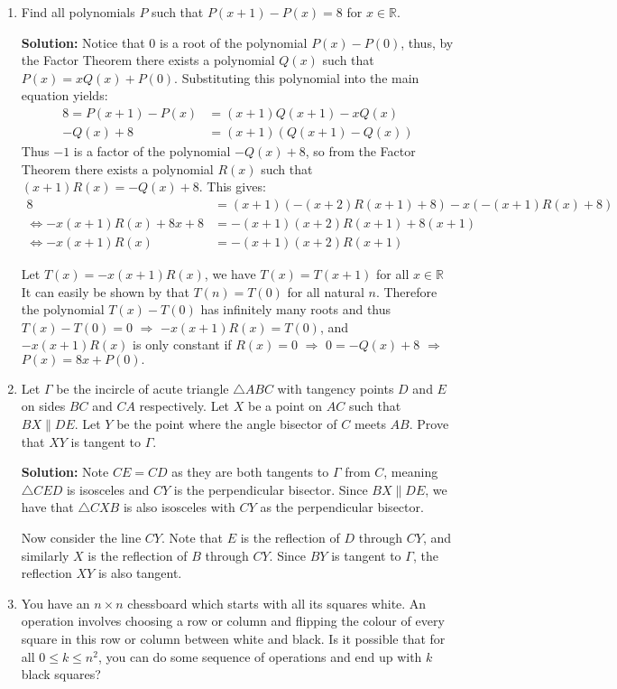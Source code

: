 \documentclass{article}
\begin{document}
\begin{enumerate}[itemsep=24pt]
\item
Find all polynomials $P$ such that $P(x+1) - P(x) = 8$ for $x\in\mathbb{R}$.

\textbf{Solution:} Notice that 0 is a root of the polynomial $P(x) - P(0)$, thus, by the Factor Theorem there exists a polynomial $Q(x)$ such that $P(x) = xQ(x) + P(0)$.
Substituting this polynomial into the main equation yields:
\begin{align*}
  8 = P(x+1) - P(x) & = (x+1)Q(x + 1) - xQ(x) \\
          -Q(x) + 8 & = (x+1)(Q(x+1) - Q(x))
\end{align*}
Thus $-1$ is a factor of the polynomial $-Q(x) + 8$, so from the Factor Theorem there exists a polynomial $R(x)$ such that $(x+1)R(x) = - Q(x) + 8$.
This gives:
\begin{align*}
  8 & = (x+1)(-(x+2)R(x+1) + 8) - x(-(x+1)R(x) + 8) \\
  \iff -x(x+1)R(x) + 8x + 8 & = -(x+1)(x+2)R(x+1) + 8(x+1) \\
  \iff -x(x+1)R(x) & = -(x+1)(x+2)R(x+1)
\end{align*}

Let $T(x) = -x(x+1)R(x)$, we have $T(x) = T(x+1)$ for all $x \in \mathbb{R}$ It can easily be shown by that $T(n) = T(0)$ for all natural $n$.
Therefore the polynomial $T(x) - T(0)$ has infinitely many roots and thus $T(x) - T(0) = 0$ $\Rightarrow$ $-x(x+1)R(x) = T(0)$, and $-x(x+1)R(x)$ is only constant if $R(x) = 0$ $\Rightarrow$ $0 = -Q(x) + 8$ $\Rightarrow$ $P(x) = 8x + P(0).$


\item %
Let $\Gamma$ be the incircle of acute triangle $\triangle ABC$ with tangency points $D$ and $E$ on sides $BC$ and $CA$ respectively.
Let $X$ be a point on $AC$ such that $BX \parallel DE$.
Let $Y$ be the point where the angle bisector of $C$ meets $AB$.
Prove that $XY$ is tangent to $\Gamma$.

\textbf{Solution:}
Note $CE = CD$ as they are both tangents to $\Gamma$ from $C$, meaning $\triangle CED$ is isosceles and $CY$ is the perpendicular bisector. Since $BX \parallel DE$, we have that $\triangle CXB$ is also isosceles with $CY$ as the perpendicular bisector.

Now consider the line $CY$. Note that $E$ is the reflection of $D$ through $CY$, and similarly $X$ is the reflection of $B$ through $CY$. Since $BY$ is tangent to $\Gamma$, the reflection $XY$ is also tangent.


\item %
You have an $n \times n$ chessboard which starts with all its squares white.
An operation involves choosing a row or column and flipping the colour of every square in this row or column between white and black.
Is it possible that for all $0 \leq k \leq n^2$, you can do some sequence of operations and end up with $k$ black squares?


\end{enumerate}
\end{document}
